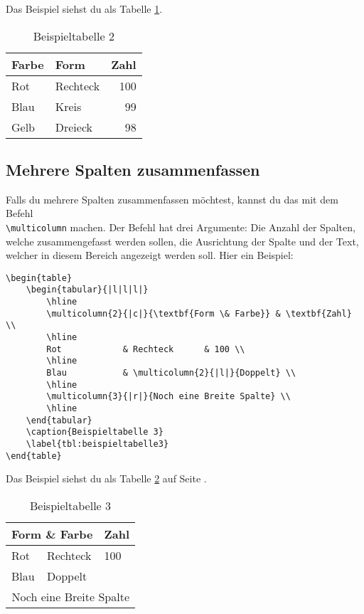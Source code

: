 Das Beispiel siehst du als Tabelle \ref{tbl:beispieltabelle2}.

\begin{table}
	\centering
	\begin{tabular}{|l|l|r|}
		\textbf{Farbe} & \textbf{Form} & \textbf{Zahl} \\
		\hline
		Rot            & Rechteck      & 100 \\
		\hline
		Blau           & Kreis         & 99 \\
		\hline
		Gelb           & Dreieck       & 98 \\
		\hline
	\end{tabular}
	\caption{Beispieltabelle 2}
	\label{tbl:beispieltabelle2}
\end{table}

\subsection{Mehrere Spalten zusammenfassen}

Falls du mehrere Spalten zusammenfassen möchtest, kannst du das mit dem Befehl
\\
 \texttt{\textbackslash multicolumn} machen. Der Befehl hat drei Argumente: Die Anzahl der Spalten, welche zusammengefasst werden sollen, die Ausrichtung der Spalte und der Text, welcher in diesem Bereich angezeigt werden soll. Hier ein Beispiel:
\begin{lstlisting}
\begin{table}
	\begin{tabular}{|l|l|l|}
		\hline
		\multicolumn{2}{|c|}{\textbf{Form \& Farbe}} & \textbf{Zahl} \\
		\hline
		Rot            & Rechteck      & 100 \\
		\hline
		Blau           & \multicolumn{2}{|l|}{Doppelt} \\
		\hline
		\multicolumn{3}{|r|}{Noch eine Breite Spalte} \\
		\hline
	\end{tabular}
	\caption{Beispieltabelle 3}
	\label{tbl:beispieltabelle3}
\end{table}
\end{lstlisting}

Das Beispiel siehst du als Tabelle \ref{tbl:beispieltabelle3} auf Seite \pageref{tbl:beispieltabelle3}.

\begin{table}
	\centering
	\begin{tabular}{|l|l|l|}
		\hline
		\multicolumn{2}{|c|}{\textbf{Form \& Farbe}} & \textbf{Zahl} \\
		\hline
		Rot            & Rechteck      & 100 \\
		\hline
		Blau           & \multicolumn{2}{l|}{Doppelt} \\
		\hline
		\multicolumn{3}{|r|}{Noch eine Breite Spalte} \\
		\hline
	\end{tabular}
	\caption{Beispieltabelle 3}
	\label{tbl:beispieltabelle3}
\end{table}

